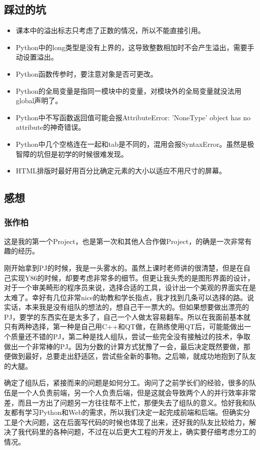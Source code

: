 \documentclass[a4paper,11pt,UTF8]{ctexart}
\begin{document}
\begin{sloppypar}
\subsection{{\bf 踩过的坑}}

\begin{itemize}
\item 课本中的溢出标志只考虑了正数的情况，所以不能直接引用。
\item Python中的long类型是没有上界的，这导致整数相加时不会产生溢出，需要手动设置溢出。
\item Python函数传参时，要注意对象是否可更改。
\item Python的全局变量是指同一模块中的变量，对模块外的全局变量就没法用global声明了。
\item Python中不写函数返回值可能会报AttributeError: 'NoneType' object has no attribute的神奇错误。
\item Python中几个空格连在一起和tab是不同的，混用会报SyntaxError。虽然是极智障的坑但是初学的时候很难发现。
\item HTML排版时最好用百分比确定元素的大小以适应不用尺寸的屏幕。
\end{itemize}

\subsection{{\bf 感想}}

\subsubsection{张作柏}
 
这是我的第一个Project，也是第一次和其他人合作做Project，的确是一次非常有趣的经历。

刚开始拿到PJ的时候，我是一头雾水的。虽然上课时老师讲的很清楚，但是在自己实现Y86的时候，却要考虑非常多的细节。但更让我头秃的是图形界面的设计，对于一个审美畸形的程序员来说，选择合适的工具，设计出一个美观的界面实在是太难了。幸好有几位非常nice的助教和学长指点，我才找到几条可以选择的路。说实话，本来我是没有组队的想法的，想自己干一票大的。但如果想要做出漂亮的PJ，要学的东西实在是太多了，自己一个人做太容易翻车。所以在我面前基本就只有两种选择，第一种是自己用C++和QT做，在熟练使用QT后，可能能做出一个质量还不错的PJ，第二种是找人组队，尝试一些完全没有接触过的技术，争取做出一个非常棒的PJ。因为分数的计算方式犹豫了一会，最后决定既然要做，那便做到最好，总要走出舒适区，尝试些全新的事物。之后嘛，就成功地抱到了队友的大腿。

确定了组队后，紧接而来的问题是如何分工。询问了之前学长们的经验，很多的队伍是一个人负责前端，另一个人负责后端，但是这就会导致两个人的并行效率非常差，而且一方出了问题另一方往往帮不上忙，那便失去了组队的意义。恰好我和队友都有学习Python和Web的需求，所以我们决定一起完成前端和后端。但确实分工是个大问题，这在后面写代码的时候也体现了出来，还好我的队友比较给力，解决了我代码里的各种问题，不过在以后更大工程的开发上，确实要仔细考虑分工的情况。


\end{sloppypar}
\end{document}
